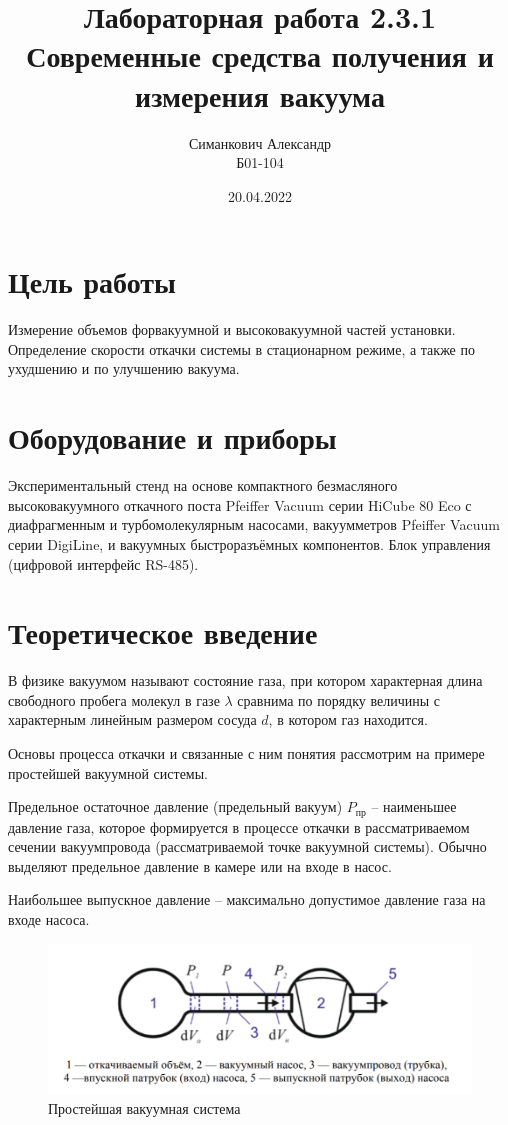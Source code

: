 \documentclass[12pt,a4paper]{article}
\title{Лабораторная работа 2.3.1\\ Современные средства получения и измерения вакуума}
\author{Симанкович Александр \\ Б01-104}
\date{20.04.2022}
\begin{document}
	\maketitle
	\section*{Цель работы} 
	Измерение объемов форвакуумной и высоковакуумной частей установки.
	Определение скорости откачки системы в стационарном режиме, а также по ухудшению и по улучшению вакуума. 
	
	\section*{Оборудование и приборы}
	Экспериментальный стенд на основе компактного безмасляного высоковакуумного откачного поста Pfeiffer Vacuum серии HiCube 80 Eco с диафрагменным и турбомолекулярным насосами, вакуумметров Pfeiffer Vacuum серии DigiLine, и вакуумных быстроразъёмных компонентов.
	Блок управления (цифровой интерфейс RS-485).
	
	\section*{Теоретическое введение}
	
	В физике вакуумом называют состояние газа, при котором характерная длина свободного пробега молекул в газе $\lambda$ сравнима по порядку величины с характерным линейным размером сосуда $d$, в котором газ находится.
	
	Основы процесса откачки и связанные с ним понятия рассмотрим на примере простейшей вакуумной системы.
	
	Предельное остаточное давление (предельный вакуум) $P_{\text{пр}}$ -- наименьшее давление газа, которое формируется в процессе откачки в рассматриваемом сечении вакуумпровода (рассматриваемой точке вакуумной системы).
	Обычно выделяют предельное давление в камере или на входе в насос.
	
	Наибольшее выпускное давление -- максимально допустимое давление газа на входе насоса.
	
	\begin{figure}[h]
		\centering
		\includegraphics[width = 11 cm]{res/1}
		\caption{Простейшая вакуумная система}
		\label{fig:vac}
	\end{figure}
	
\end{document}
